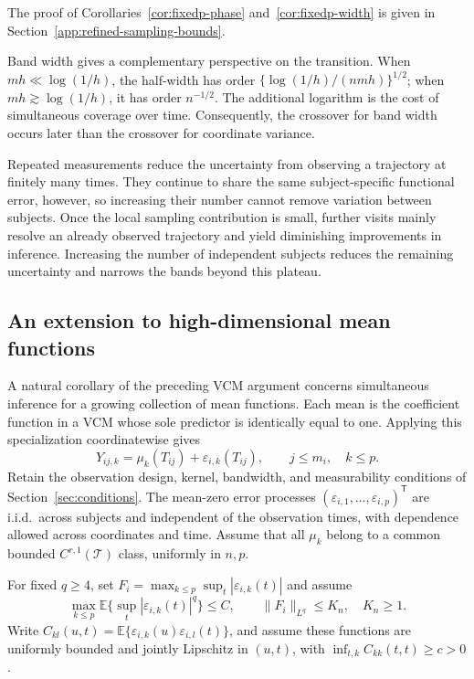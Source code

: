 \documentclass[12pt]{article}
\newcommand{\expect}{\mathbb{E}}
\newcommand{\trans}{{\scriptscriptstyle\mathsf{T}}}
\numberwithin{equation}{section}
\begin{document}
The proof of Corollaries~\ref{cor:fixedp-phase} and~\ref{cor:fixedp-width}
is given in Section~\ref{app:refined-sampling-bounds}.

Band width gives a complementary perspective on the transition. When
$mh\ll\log(1/h)$, the half-width has order
$\{\log(1/h)/(nmh)\}^{1/2}$; when $mh\gtrsim\log(1/h)$, it has
order $n^{-1/2}$. The additional logarithm is the cost of simultaneous
coverage over time. Consequently, the crossover for band width occurs
later than the crossover for coordinate variance.

Repeated measurements reduce the uncertainty from observing a
trajectory at finitely many times. They continue to share the same
subject-specific functional error, however, so increasing their number
cannot remove variation between subjects. Once the local sampling
contribution is small, further visits mainly resolve an already
observed trajectory and yield diminishing improvements in inference.
Increasing the number of independent subjects reduces the remaining
uncertainty and narrows the bands beyond this plateau.

\subsection{An extension to high-dimensional mean functions}
\label{sec:mean-model}

A natural corollary of the preceding VCM argument concerns simultaneous
inference for a growing collection of mean functions. Each mean is the
coefficient function in a VCM whose sole predictor is identically equal
to one. Applying this specialization coordinatewise gives
\[
Y_{ij,k}=\mu_k(T_{ij})+\varepsilon_{i,k}(T_{ij}),
\qquad j\le m_i,\quad k\le p.
\]
Retain the observation design, kernel, bandwidth, and measurability
conditions of Section~\ref{sec:conditions}. The mean-zero error processes
$(\varepsilon_{i,1},\ldots,\varepsilon_{i,p})^\trans$ are i.i.d.\ across
subjects and independent of the observation times, with dependence
allowed across coordinates and time. Assume that all $\mu_k$ belong
to a common bounded $C^{r,1}(\mathcal T)$ class, uniformly in $n,p$.

For fixed $q\ge4$, set
$F_i=\max_{k\le p}\sup_t|\varepsilon_{i,k}(t)|$ and assume
\begin{equation*}
\max_{k\le p}\expect\{\sup_t|\varepsilon_{i,k}(t)|^q\}\le C,
\qquad \|F_i\|_{L^q}\le K_n,\quad K_n\ge1.
\end{equation*}
Write
$C_{kl}(u,t)=\expect\{\varepsilon_{i,k}(u)\varepsilon_{i,l}(t)\}$,
and assume these functions are uniformly bounded and jointly Lipschitz
in $(u,t)$, with $\inf_{t,k}C_{kk}(t,t)\ge c>0$.
\end{document}
